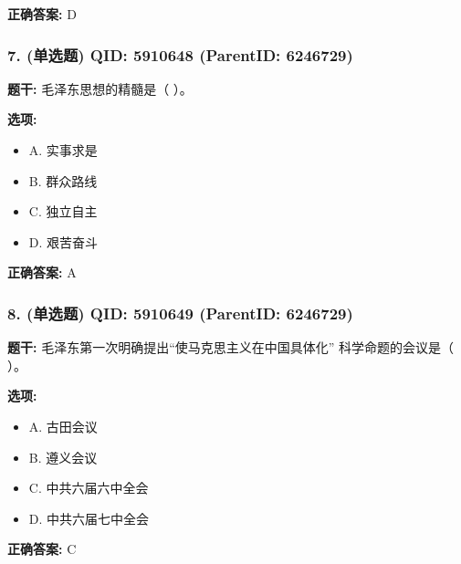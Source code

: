 \documentclass[12pt,UTF8]{ctexart}
\begin{document}
\textbf{正确答案:}
D

\vspace{0.3em}\hrulefill\vspace{0.7em}

\subsubsection*{7. (单选题) \small QID: 5910648 (ParentID: 6246729)}

\textbf{题干:}
毛泽东思想的精髓是（ ）。



\textbf{选项:}
\begin{itemize}[leftmargin=*]

  \item A. 实事求是

  \item B. 群众路线

  \item C. 独立自主

  \item D. 艰苦奋斗

\end{itemize}

\textbf{正确答案:}
A

\vspace{0.3em}\hrulefill\vspace{0.7em}

\subsubsection*{8. (单选题) \small QID: 5910649 (ParentID: 6246729)}

\textbf{题干:}
毛泽东第一次明确提出“使马克思主义在中国具体化” 科学命题的会议是（ ）。



\textbf{选项:}
\begin{itemize}[leftmargin=*]

  \item A. 古田会议

  \item B. 遵义会议

  \item C. 中共六届六中全会

  \item D. 中共六届七中全会

\end{itemize}

\textbf{正确答案:}
C
\end{document}
